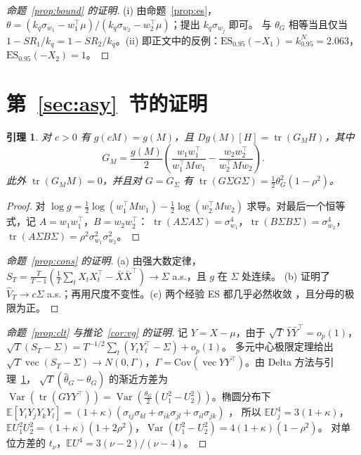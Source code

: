 \documentclass[11pt,UTF8]{ctexart}
\newcommand{\E}{\mathbb{E}}
\newcommand{\ES}{\mathrm{ES}}
\newcommand{\Var}{\operatorname{Var}}
\newcommand{\tr}{\operatorname{tr}}
\newcommand{\vecop}{\operatorname{vec}}
\newtheorem{lemma}{引理}
\begin{document}
\begin{proof}[命题~\ref{prop:bound} 的证明]
(i) 由命题~\ref{prop:es}，$\theta=(k_q\sigma_{w_1}-w_1^\top\mu)/(k_q\sigma_{w_2}-w_2^\top\mu)$；提出 $k_q\sigma_{w_j}$ 即可。
与 $\theta_G$ 相等当且仅当 $1-SR_1/k_q=1-SR_2/k_q$。(ii) 即正文中的反例：$\ES_{0.95}(-X_1)=k^N_{0.95}=2.063$，$\ES_{0.95}(-X_2)=1$。
\end{proof}

\section{第~\ref{sec:asy}~节的证明}\label{app:asy}

\begin{lemma}\label{lem:g}
对 $c>0$ 有 $g(cM)=g(M)$，且 $Dg(M)[H]=\tr(G_MH)$，其中
\[
G_M=\frac{g(M)}2\left(\frac{w_1w_1^\top}{w_1^\top Mw_1}-\frac{w_2w_2^\top}{w_2^\top Mw_2}\right).
\]
此外 $\tr(G_MM)=0$，并且对 $G=G_\Sigma$ 有 $\tr(G\Sigma G\Sigma)=\frac12\theta_G^2(1-\rho^2)$。
\end{lemma}

\begin{proof}
对 $\log g=\frac12\log(w_1^\top Mw_1)-\frac12\log(w_2^\top Mw_2)$ 求导。对最后一个恒等式，记 $A=w_1w_1^\top$，$B=w_2w_2^\top$：
$\tr(A\Sigma A\Sigma)=\sigma_{w_1}^4$，$\tr(B\Sigma B\Sigma)=\sigma_{w_2}^4$，$\tr(A\Sigma B\Sigma)=\rho^2\sigma_{w_1}^2\sigma_{w_2}^2$。
\end{proof}

\begin{proof}[命题~\ref{prop:cons} 的证明]
(a) 由强大数定律，$S_T=\frac T{T-1}(\frac1T\sum_tX_tX_t^\top-\bar X\bar X^\top)\to\Sigma$ a.s.，且 $g$ 在 $\Sigma$ 处连续。
(b) \citet{tyler1987} 证明了 $\hat V_T\to c\Sigma$ a.s.；再用尺度不变性。(c) 两个经验 ES 都几乎必然收敛 \citep{acerbi2002}，且分母的极限为正。
\end{proof}

\begin{proof}[命题~\ref{prop:clt} 与推论~\ref{cor:vg} 的证明]
记 $Y=X-\mu$，由于 $\sqrt T\,\bar Y\bar Y^\top=o_p(1)$，$\sqrt T(S_T-\Sigma)=T^{-1/2}\sum_t(Y_tY_t^\top-\Sigma)+o_p(1)$。
多元中心极限定理给出 $\sqrt T\vecop(S_T-\Sigma)\to N(0,\Gamma)$，$\Gamma=\mathrm{Cov}(\vecop YY^\top)$。由 Delta 方法与引理~\ref{lem:g}，
$\sqrt T(\hat\theta_G-\theta_G)$ 的渐近方差为 $\Var(\tr(GYY^\top))=\Var(\frac{\theta_G}2(U_1^2-U_2^2))$。椭圆分布下
$\E[Y_iY_jY_kY_l]=(1+\kappa)(\sigma_{ij}\sigma_{kl}+\sigma_{ik}\sigma_{jl}+\sigma_{il}\sigma_{jk})$ \citep{muirhead1982}，
所以 $\E U_j^4=3(1+\kappa)$，$\E U_1^2U_2^2=(1+\kappa)(1+2\rho^2)$，$\Var(U_1^2-U_2^2)=4(1+\kappa)(1-\rho^2)$。
对单位方差的 $t_\nu$，$\E U^4=3(\nu-2)/(\nu-4)$。
\end{proof}
\end{document}
